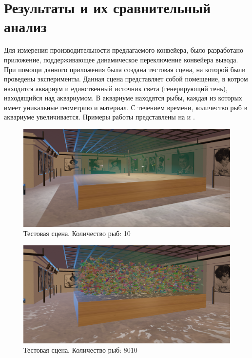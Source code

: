 \chapter{Результаты и их сравнительный анализ} \label{ch4}


	Для измерения производительности предлагаемого конвейера, было разработано приложение, поддерживающее динамическое переключение конвейера вывода. При помощи данного приложения была создана тестовая сцена, на которой были проведены эксперименты. Данная сцена представляет собой помещение, в котром находится аквариум и единственный источник света (генерирующий тень), находящийся над аквариумом. В аквариуме находятся рыбы, каждая из которых имеет уникальные геометрию и материал. С течением времени, количество рыб в аквариуме увеличивается. Примеры работы представлены на  и .
	
	\begin{figure}[ht!] 
		\center
		\includegraphics [scale=0.4] {my_folder/images//empty_aquarium}	
		\caption{Тестовая сцена. Количество рыб: 10} 
		\label{fig:empty_aquarium}
	\end{figure}
	
	\begin{figure}[ht!] 
		\center
		\includegraphics [scale=0.4] {my_folder/images//full_aquarium}	
		\caption{Тестовая сцена. Количество рыб: 8010} 
		\label{fig:full_aquarium}
	\end{figure}
	
